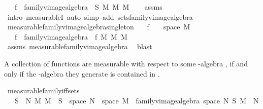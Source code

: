 \begin{isabellebody}
\ \ \ {\isachardoublequoteopen}f\ {\isasymin}\ family{\isacharunderscore}{\kern0pt}vimage{\isacharunderscore}{\kern0pt}algebra\ {\isasymOmega}\ S\ M\ {\isasymrightarrow}\isactrlsub M\ M{\isachardoublequoteclose}\isanewline
%
\isadelimproof
\ \ %
\endisadelimproof
%
\isatagproof
{}\isamarkupfalse%
\ assms\ \isamarkupfalse%
\ {\isacharparenleft}{\kern0pt}intro\ measurableI{\isacharcomma}{\kern0pt}\ auto\ simp\ add{\isacharcolon}{\kern0pt}\ sets{\isacharunderscore}{\kern0pt}family{\isacharunderscore}{\kern0pt}vimage{\isacharunderscore}{\kern0pt}algebra{\isacharparenright}{\kern0pt}%
\endisatagproof
{\isafoldproof}%
%
\isadelimproof
\isanewline
%
\endisadelimproof
\isanewline
{}\isamarkupfalse%
\ measurable{\isacharunderscore}{\kern0pt}family{\isacharunderscore}{\kern0pt}vimage{\isacharunderscore}{\kern0pt}algebra{\isacharunderscore}{\kern0pt}singleton{\isacharcolon}{\kern0pt}\isanewline
\ \ \ {\isachardoublequoteopen}f\ {\isasymin}\ {\isasymOmega}\ {\isasymrightarrow}\ space\ M{\isachardoublequoteclose}\isanewline
\ \ \ {\isachardoublequoteopen}f\ {\isasymin}\ family{\isacharunderscore}{\kern0pt}vimage{\isacharunderscore}{\kern0pt}algebra\ {\isasymOmega}\ {\isacharbraceleft}{\kern0pt}f{\isacharbraceright}{\kern0pt}\ M\ {\isasymrightarrow}\isactrlsub M\ M{\isachardoublequoteclose}\isanewline
%
\isadelimproof
\ \ %
\endisadelimproof
%
\isatagproof
{}\isamarkupfalse%
\ assms\ measurable{\isacharunderscore}{\kern0pt}family{\isacharunderscore}{\kern0pt}vimage{\isacharunderscore}{\kern0pt}algebra\ \isamarkupfalse%
\ blast%
\endisatagproof
{\isafoldproof}%
%
\isadelimproof
%
\endisadelimproof
%
\begin{isamarkuptext}%
A collection of functions are measurable with respect to some \isa{{\isasymsigma}}-algebra , if and only if the \isa{{\isasymsigma}}-algebra they generate is contained in .%
\end{isamarkuptext}\isamarkuptrue%
\isamarkupfalse%
\ measurable{\isacharunderscore}{\kern0pt}family{\isacharunderscore}{\kern0pt}iff{\isacharunderscore}{\kern0pt}sets{\isacharcolon}{\kern0pt}\isanewline
\ \ \ {\isachardoublequoteopen}{\isacharparenleft}{\kern0pt}S\ {\isasymsubseteq}\ N\ {\isasymrightarrow}\isactrlsub M\ M{\isacharparenright}{\kern0pt}\ {\isasymlongleftrightarrow}\ S\ {\isasymsubseteq}\ space\ N\ {\isasymrightarrow}\ space\ M\ {\isasymand}\ family{\isacharunderscore}{\kern0pt}vimage{\isacharunderscore}{\kern0pt}algebra\ {\isacharparenleft}{\kern0pt}space\ N{\isacharparenright}{\kern0pt}\ S\ M\ {\isasymsubseteq}\ N{\isachardoublequoteclose}\isanewline

\end{isabellebody}
